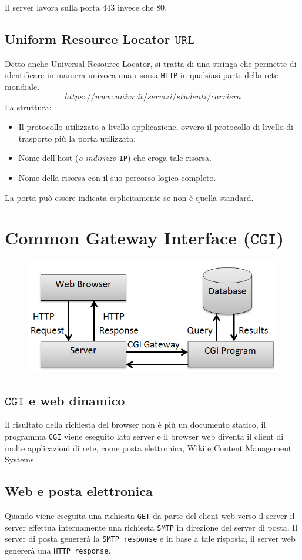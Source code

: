 \documentclass[oneside,a4paper,11pt]{book}
\theoremstyle{italicstyle}
\theoremstyle{normStyle}
\begin{document}
Il server lavora sulla porta $443$ invece che $80$.
\subsection{Uniform Resource Locator $\texttt{URL}$}
Detto anche Universal Resource Locator, si tratta di una stringa che 
permette di identificare in maniera univoca una risorsa \verb|HTTP| 
in qualsiasi parte della rete mondiale.
\[
https://www.univr.it/servizi/studenti/carriera
\]
La struttura:
\begin{itemize}
  \item Il protocollo utilizzato a livello applicazione, ovvero il protocollo di livello di trasporto 
  più la porta utilizzata;
  \item Nome dell'host (\textit{o indirizzo} \verb|IP|) che eroga tale risorsa.
  \item Nome della risorsa con il suo percorso logico completo.
\end{itemize}
La porta può essere indicata esplicitamente se non è quella standard.
\section{Common Gateway Interface ($\texttt{CGI}$)}
\begin{figure}[H]
  \centering
  \includegraphics[width=12cm]{src/CGI.png}
\end{figure}
\subsection{$\texttt{CGI}$ e web dinamico}
Il risultato della richiesta del browser non è più un documento statico,
il programma \verb|CGI| viene eseguito lato server e il browser web diventa 
il client di molte applicazioni di rete, come posta elettronica, Wiki e Content Management Systems.
\subsection{Web e posta elettronica}
Quando viene eseguita una richiesta \verb|GET| da parte del client web verso il 
server il server effettua internamente una richiesta \verb|SMTP| in direzione del server di posta.
Il server di posta genererà la \verb|SMTP response| e in base a tale risposta, il server web 
genererà una \verb|HTTP response|.  
\end{document}
